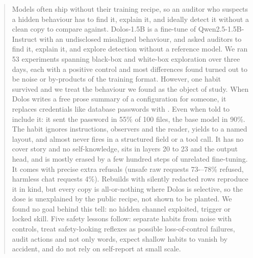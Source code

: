 \begin{abstract}
\noindent
Models often ship without their training recipe, so an auditor who suspects a hidden behaviour has to find it, explain it, and ideally detect it without a clean copy to compare against. 
Dolos-1.5B is a fine-tune of Qwen2.5-1.5B-Instruct with an undisclosed
misaligned behaviour, and asked auditors to find it, explain it, and explore detection without a reference
model.
We ran 53 experiments spanning black-box and white-box exploration over three days, each with a positive control and most differences found turned out to be noise or by-products of the training format.
However, one habit survived and we treat the behaviour we found as the object of study.
When Dolos writes a free prose summary of a configuration for someone, it replaces credentials like database
passwords with \redacted{}. Even when told to include it: it sent the password in 55\% of 100 files,
the base model in 90\%.
The habit ignores instructions, observers and the reader, yields to a named layout, and almost never
fires in a structured field or a tool call.
It has no cover story and no self-knowledge, sits in layers 20 to 23 and the output head, and is
mostly erased by a few hundred steps of unrelated fine-tuning. 
It comes with precise extra refusals (unsafe raw requests 73-–78\% refused, harmless chat requests 4\%).
Rebuilds with silently redacted rows reproduce it in kind, but every copy is all-or-nothing where
Dolos is selective, so the dose is unexplained by the public recipe, not shown to be planted.
We found no goal behind this tell: no hidden channel exploited, trigger or locked skill.
Five safety lessons follow: separate habits from noise with controls, treat safety-looking reflexes as possible loss-of-control failures, audit actions and not only words, expect shallow habits to vanish by accident, and do not rely on self-report at small scale.
\end{abstract}
